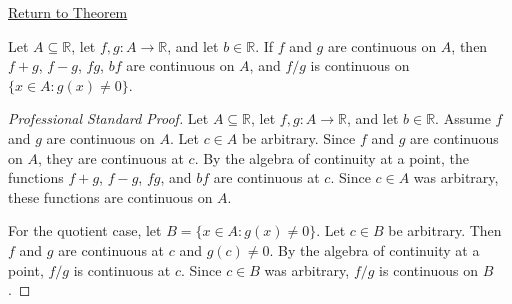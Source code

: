 \newpage
{}
\label{prf:algebra-of-continuity-on-a-set}

\begin{remark*}[Return]
\hyperref[thm:algebra-of-continuity-on-a-set]{Return to Theorem}
\end{remark*}

\begin{theorem*}
Let $A \subseteq \mathbb{R}$, let $f,g : A \to \mathbb{R}$, and let $b \in \mathbb{R}$. If $f$ and $g$ are continuous on $A$, then $f+g$, $f-g$, $fg$, $bf$ are continuous on $A$, and $f/g$ is continuous on $\{x \in A : g(x) \neq 0\}$.
\end{theorem*}

\begin{proof}[Professional Standard Proof]
\LRAProofBodyStart
Let $A \subseteq \mathbb{R}$, let $f,g : A \to \mathbb{R}$, and let $b \in \mathbb{R}$. Assume $f$ and $g$ are continuous on $A$. Let $c \in A$ be arbitrary. Since $f$ and $g$ are continuous on $A$, they are continuous at $c$. By the algebra of continuity at a point, the functions $f+g$, $f-g$, $fg$, and $bf$ are continuous at $c$. Since $c \in A$ was arbitrary, these functions are continuous on $A$.

For the quotient case, let $B = \{x \in A : g(x) \neq 0\}$. Let $c \in B$ be arbitrary. Then $f$ and $g$ are continuous at $c$ and $g(c) \neq 0$. By the algebra of continuity at a point, $f/g$ is continuous at $c$. Since $c \in B$ was arbitrary, $f/g$ is continuous on $B$.
\end{proof}

